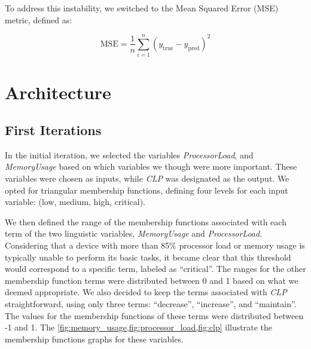 \documentclass[titlepage]{article}
\begin{document}
To address this instability, we switched to the Mean Squared Error (MSE) metric, defined as:

\begin{equation}
    \text{MSE} = \frac{1}{n} \sum_{i=1}^{n} (y_{\text{true}} - y_{\text{pred}})^2
    \label{eq:mse}
\end{equation}


\section{Architecture}
\subsection{First Iterations}
\label{sec:first_iterations}

In the initial iteration, we selected the variables \textit{ProcessorLoad}, and \textit{MemoryUsage} based on which variables we though were more important.
These variables were chosen as inputs, while \textit{CLP} was designated as the output.
We opted for triangular membership functions, defining four levels for each input variable: (low, medium, high, critical).

We then defined the range of the membership functions associated with each term of the two linguistic variables, \textit{MemoryUsage} and \textit{ProcessorLoad}.
Considering that a device with more than 85\% processor load or memory usage is typically unable to perform its basic tasks,
it became clear that this threshold would correspond to a specific term, labeled as ``critical''.
The ranges for the other membership function terms were distributed between 0 and 1 based on what we deemed appropriate.
We also decided to keep the terms associated with \textit{CLP} straightforward, using only three terms: ``decrease'', ``increase'', and ``maintain''.
The values for the membership functions of these terms were distributed between -1 and 1. The \cref{fig:memory_usage,fig:processor_load,fig:clp} illustrate the membership functions graphs for these variables.
\end{document}
